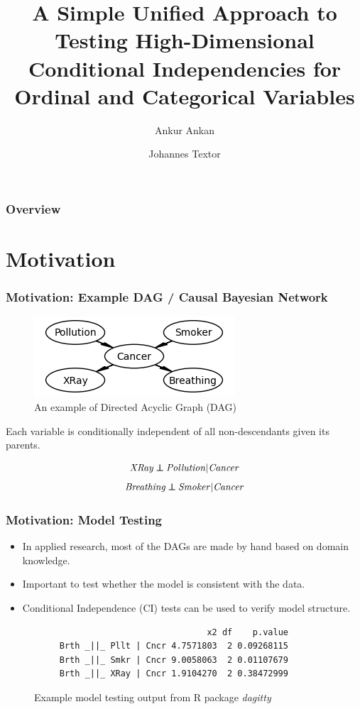 \documentclass{beamer}
\def\ci{\perp\!\!\!\!\!\perp}
\begin{document}
\title{A Simple Unified Approach to Testing High-Dimensional Conditional Independencies for Ordinal and Categorical Variables}
\author {Ankur Ankan \and Johannes Textor}
\date{}
\maketitle

\begin{frame}
	\frametitle{Overview}
	\tableofcontents
\end{frame}

\section{Motivation}
\begin{frame}
	\frametitle{Motivation: Example DAG / Causal Bayesian Network}
	\begin{figure}
		\centering
		\includegraphics[scale=0.6]{imgs/example_dag.png}
		\caption*{An example of Directed Acyclic Graph (DAG) \footnotemark}
	\end{figure}
	\begin{center}

	Each variable is conditionally independent of all non-descendants given its parents.

			$$ \text{\emph{XRay}} \ci \text{\emph{Pollution}} | \text{\emph{Cancer}} $$
			$$ \text{\emph{Breathing}} \ci \text{\emph{Smoker}} | \text{\emph{Cancer}} $$
	\end{center}
\end{frame}

\begin{frame}[fragile]
	\frametitle{Motivation: Model Testing}
	\begin{itemize}
		\setlength\itemsep{1em}
		\item In applied research, most of the DAGs are made by hand
			based on domain knowledge.
		\item Important to test whether the model is consistent with the data.
		\item Conditional Independence (CI) tests can be used to verify model structure.
	\end{itemize}
	\begin{figure}
 	\begin{verbatim}
	                              x2 df    p.value
	 Brth _||_ Pllt | Cncr 4.7571803  2 0.09268115
	 Brth _||_ Smkr | Cncr 9.0058063  2 0.01107679
	 Brth _||_ XRay | Cncr 1.9104270  2 0.38472999
 	\end{verbatim}
		\caption*{Example model testing output from R package \emph{dagitty}}
	\end{figure}

\end{frame}
\end{document}

